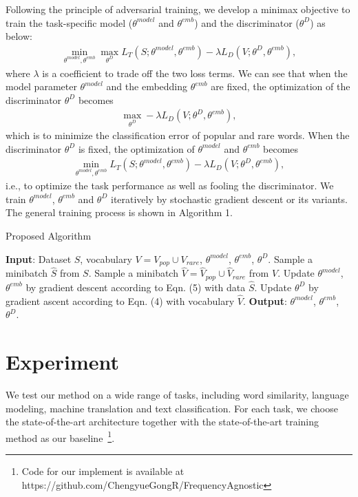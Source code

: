 \documentclass{article}
\begin{document}
Following the principle of adversarial training, we develop a minimax objective to train the task-specific model ($\theta^{model}  $ and $\theta^{emb} $) and the discriminator ($\theta^D $) as below:
\begin{eqnarray}
\min_{\theta^{model},\theta^{emb}}\max_{\theta^{D}} L_T(S;\theta^{model},\theta^{emb}) - \lambda L_D(V;\theta^{D},\theta^{emb}),
\end{eqnarray}
where $\lambda$ is a coefficient to trade off the two loss terms. We can see that when the model parameter $\theta^{model}$ and the embedding $\theta^{emb}$ are fixed, the optimization of the discriminator $\theta^D$ becomes
\begin{eqnarray}
\max_{\theta^{D}} - \lambda L_D(V;\theta^{D},\theta^{emb}),
\end{eqnarray}
which is to minimize the classification error of popular and rare words. When the discriminator $\theta^D$ is fixed, the optimization of $\theta^{model}$ and $\theta^{emb}$ becomes \begin{eqnarray}
\min_{\theta^{model},\theta^{emb}} L_T(S;\theta^{model},\theta^{emb}) - \lambda L_D(V;\theta^{D},\theta^{emb}),
\end{eqnarray}
i.e., to optimize the task performance as well as fooling the discriminator. We train $\theta^{model}$, $\theta^{emb}$ and $\theta^{D}$ iteratively by stochastic gradient descent or its variants. The general training process is shown in Algorithm 1.

\begin{algorithm}
\caption{Proposed Algorithm}\label{alg}
\begin{algorithmic}[1]
\State \textbf{Input}: Dataset $S$, vocabulary $V=V_{pop} 	\cup V_{rare}$, $\theta^{model}$, $\theta^{emb}$, $\theta^{D}$.
\Repeat
\State Sample a minibatch $\hat{S}$ from $S$.
\State Sample a minibatch $\hat{V}=\hat{V}_{pop} 	\cup \hat{V}_{rare}$ from $V$.
\State Update $\theta^{model}$, $\theta^{emb}$ by gradient descent according to Eqn. (5) with data $\hat{S}$.
\State Update $\theta^{D}$ by gradient ascent according to Eqn. (4) with vocabulary $\hat{V}$.
\State \textbf{Output}: $\theta^{model}$, $\theta^{emb}$, $\theta^{D}$.
\end{algorithmic}
\end{algorithm}



\section{Experiment}
\label{Experiment}
We test our method on a wide range of tasks, including word similarity, language modeling, machine translation and text classification. For each task, we choose the state-of-the-art architecture together with the state-of-the-art training method as our baseline~\footnote{Code for our implement is available at https://github.com/ChengyueGongR/FrequencyAgnostic}.
\end{document}
